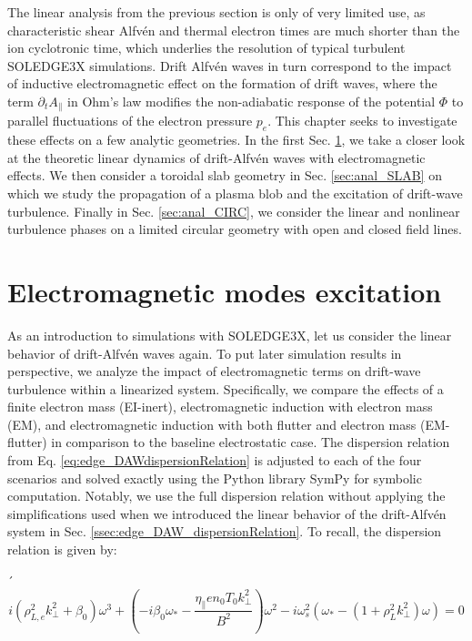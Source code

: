 The linear analysis from the previous section is only of very limited use, as characteristic shear Alfvén and thermal electron times are much shorter than the ion cyclotronic time, which underlies the resolution of typical turbulent SOLEDGE3X simulations. Drift Alfvén waves in turn correspond to the impact of inductive electromagnetic effect on the formation of drift waves, where the term $\partial_t A_\parallel$ in Ohm's law modifies the non-adiabatic response of the potential $\Phi$ to parallel fluctuations of the electron pressure $p_e$. This chapter seeks to investigate these effects on a few analytic geometries. In the first Sec. \ref{sec:anal_DAW_modeExcitation}, we take a closer look at the theoretic linear dynamics of drift-Alfvén waves with electromagnetic effects. We then consider a toroidal slab geometry in Sec. \ref{sec:anal_SLAB} on which we study the propagation of a plasma blob and the excitation of drift-wave turbulence. Finally in Sec. \ref{sec:anal_CIRC}, we consider the linear and nonlinear turbulence phases on a limited circular geometry with open and closed field lines.


\section{Electromagnetic modes excitation}
\label{sec:anal_DAW_modeExcitation}

As an introduction to simulations with SOLEDGE3X, let us consider the linear behavior of drift-Alfvén waves again. To put later simulation results in perspective, we analyze the impact of electromagnetic terms on drift-wave turbulence within a linearized system. Specifically, we compare the effects of a finite electron mass (EI-inert), electromagnetic induction with electron mass (EM), and electromagnetic induction with both flutter and electron mass (EM-flutter) in comparison to the baseline electrostatic case. The dispersion relation from Eq. \ref{eq:edge_DAWdispersionRelation} is adjusted to each of the four scenarios and solved exactly using the Python library SymPy for symbolic computation. Notably, we use the full dispersion relation without applying the simplifications used when we introduced the linear behavior of the drift-Alfvén system in Sec. \ref{ssec:edge_DAW_dispersionRelation}. To recall, the dispersion relation is given by: 

´\begin{equation}
	\label{eq:anal_DAWdispersionRelation}
	i\left(\rho_{L,e}^2k_\perp^2 + \beta_0\right)\omega^3 + \left(-i\beta_0\omega_* - \frac{\eta_\parallel en_0T_0k_\perp^2}{B^2}\right)\omega^2 - i\omega_s^2\left(\omega_*-\left(1 + \rho_L^2 k_\perp^2\right)\omega\right) = 0
\end{equation}


